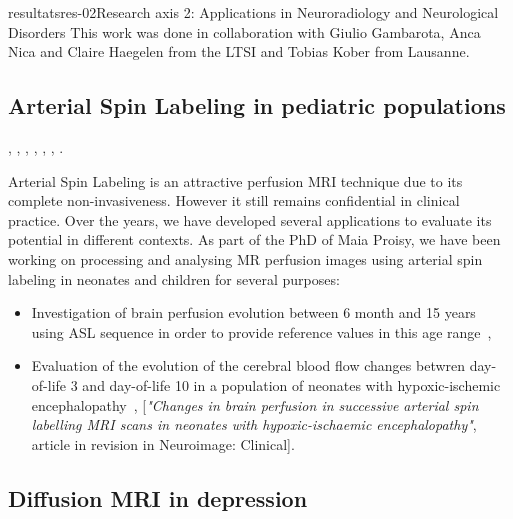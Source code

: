 \documentclass{ra2018}
\begin{document}
\begin{module}{resultats}{res-02}{Research axis 2: Applications in Neuroradiology and Neurological Disorders}
This work was done in collaboration with Giulio Gambarota, Anca Nica and Claire Haegelen from the LTSI and Tobias Kober from Lausanne.

\subsection{Arterial Spin Labeling in pediatric populations}
\begin{participants}
      ,
      ,
      ,
      ,
      ,
      ,
      .
\end{participants}
Arterial Spin Labeling is an attractive perfusion MRI technique due to its complete non-invasiveness. However
it still remains confidential in clinical practice. Over the years, we have developed several applications to
evaluate its potential in different contexts. As part of the PhD of Maia Proisy, we have been working on processing and analysing MR perfusion images using arterial spin labeling in neonates and children for several purposes:
\begin{itemize}
    \item Investigation of brain perfusion evolution between 6 month and 15 years using ASL sequence in order to provide reference values in this age range~\cite{carsinvu:inserm-01708945},
    \item Evaluation of the evolution of the cerebral blood flow changes betwren day-of-life 3 and day-of-life 10 in a population of neonates with hypoxic-ischemic encephalopathy~\cite{proisy:inserm-01944507}, [\textit{"Changes in brain perfusion in successive arterial spin labelling MRI scans in neonates with hypoxic-ischaemic encephalopathy"}, article in revision in Neuroimage: Clinical].
\end{itemize}

\subsection{Diffusion MRI in depression}

\end{module}
\end{document}
